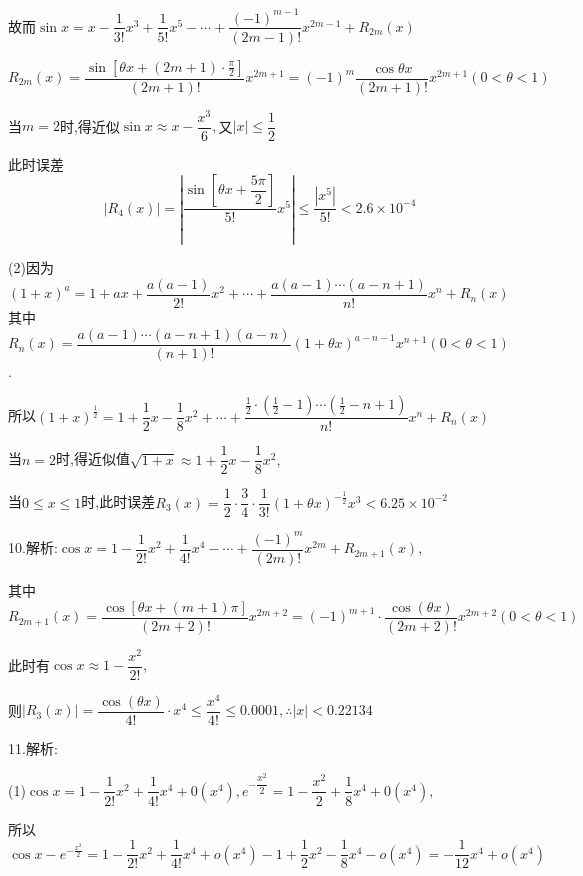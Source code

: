 故而$\sin x = x - \dfrac{1}{{3!}}{x^3} + \dfrac{1}{{5!}}{x^5} -  \cdots  + \dfrac{{{{( - 1)}^{m - 1}}}}{{(2m - 1)!}}{x^{2m - 1}} + {R_{2m}}(x)$

${R_{2m}}(x) = \dfrac{{\sin [\theta x + (2m + 1) \cdot \frac{\pi }{2}]}}{{(2m + 1)!}}{x^{2m + 1}} = {( - 1)^m}\dfrac{{\cos \theta x}}{{(2m + 1)!}}{x^{2m + 1}}(0 < \theta  < 1)$

当$m = 2$时,得近似$\sin x \approx x - \dfrac{{{x^3}}}{6},$又$\left| x \right| \le \dfrac{1}{2}$

此时误差\[\left| {{R_4}(x)} \right| = \left| {\dfrac{{\sin [\theta x + \dfrac{{5\pi }}{2}]}}{{5!}}{x^5}} \right| \le \dfrac{{\left| {{x^5}} \right|}}{{5!}} < 2.6 \times {10^{ - 4}}\]

(2)因为${(1 + x)^a} = 1 + ax + \dfrac{{a(a - 1)}}{{2!}}{x^2} +  \cdots  + \dfrac{{a(a - 1) \cdots (a - n + 1)}}{{n!}}{x^n} + {R_n}(x)$其中${R_n}(x) = \dfrac{{a(a - 1) \cdots (a - n + 1)(a - n)}}{{(n + 1)!}}{(1 + \theta x)^{a - n - 1}}{x^{n + 1}}(0 < \theta  < 1)$.

所以${(1 + x)^{\frac{1}{2}}} = 1 + \dfrac{1}{2}x - \dfrac{1}{8}{x^2} +  \cdots  + \dfrac{{\frac{1}{2} \cdot (\frac{1}{2} - 1) \cdots (\frac{1}{2} - n + 1)}}{{n!}}{x^n} + {R_n}(x)$

当$n = 2$时,得近似值$\sqrt {1 + x}  \approx 1 + \dfrac{1}{2}x - \dfrac{1}{8}{x^2},$

当$0 \le x \le 1$时,此时误差${R_3}(x) = \dfrac{1}{2} \cdot \dfrac{3}{4} \cdot \dfrac{1}{{3!}}{(1 + \theta x)^{ - \frac{1}{2}}}{x^3} < 6.25 \times {10^{ - 2}}$

10.解析:$\cos x = 1 - \dfrac{1}{{2!}}{x^2} + \dfrac{1}{{4!}}{x^4} -  \cdots  + \dfrac{{{{( - 1)}^m}}}{{(2m)!}}{x^{2m}} + {R_{2m + 1}}(x),$

其中${R_{2m + 1}}(x) = \dfrac{{\cos [\theta x + (m + 1)\pi ]}}{{(2m + 2)!}}{x^{2m + 2}} = {( - 1)^{m + 1}} \cdot \dfrac{{\cos (\theta x)}}{{(2m + 2)!}}{x^{2m + 2}}(0 < \theta  < 1)$

此时有$\cos x \approx 1 - \dfrac{{{x^2}}}{{2!}},$

则$\left| {{R_3}(x)} \right| = \dfrac{{\cos (\theta x)}}{{4!}} \cdot {x^4} \le \dfrac{{{x^4}}}{{4!}} \le 0.0001,\therefore \left| x \right| < 0.22134$

11.解析:

(1)$\cos x = 1 - \dfrac{1}{{2!}}{x^2} + \dfrac{1}{{4!}}{x^4} + 0({x^4}),{e^{ - \dfrac{{{x^2}}}{2}}} = 1 - \dfrac{{{x^2}}}{2} + \dfrac{1}{8}{x^4} + 0({x^4}),$

所以$\cos x - {e^{ - \frac{{{x^2}}}{2}}} = 1 - \dfrac{1}{{2!}}{x^2} + \dfrac{1}{{4!}}{x^4} + o({x^4}) - 1 + \dfrac{1}{2}{x^2} - \dfrac{1}{8}{x^4} - o({x^4}) =  - \dfrac{1}{{12}}{x^4} + o({x^4})$

